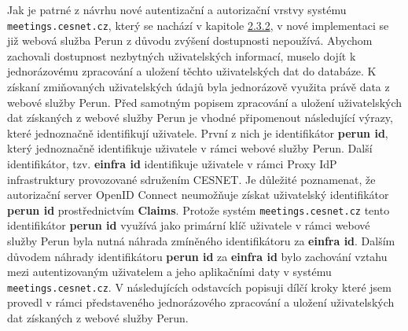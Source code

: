 \documentclass[
  printed, %
  twoside, %
  table,   %
  nolof,     %
  nolot,     %
]{fithesis3}
\begin{document}
\par 

Jak je patrné z návrhu nové autentizační a autorizační vrstvy systému \texttt{meetings.cesnet.cz}, který se nachází v kapitole \hyperref[shong-proposal]{2.3.2}, v nové implementaci se již webová služba Perun z důvodu zvýšení dostupnosti nepoužívá. Abychom zachovali dostupnost nezbytných uživatelských informací, muselo dojít k jednorázovému zpracování a uložení těchto uživatelských dat do databáze. K získaní zmiňovaných uživatelských údajů byla jednorázově využita právě data z webové služby Perun. Před samotným popisem zpracování a uložení uživatelských dat získaných z webové služby Perun je vhodné připomenout následující výrazy, které jednoznačně identifikují uživatele. První z nich je identifikátor \textbf{perun id}, který jednoznačně identifikuje uživatele v rámci webové služby Perun. Další identifikátor, tzv. \textbf{einfra id} identifikuje uživatele v rámci Proxy IdP infrastruktury provozované sdružením CESNET. Je důležité poznamenat, že autorizační server OpenID Connect neumožňuje získat uživatelský identifikátor \textbf{perun id} prostřednictvím \textbf{Claims}. Protože systém \texttt{meetings.cesnet.cz} tento identifikátor \textbf{perun id} využívá jako primární klíč uživatele v rámci webové služby Perun byla nutná náhrada zmíněného identifikátoru za \textbf{einfra id}. Dalším důvodem náhrady identifikátoru \textbf{perun id} za \textbf{einfra id} bylo zachování vztahu mezi autentizovaným uživatelem a jeho aplikačními daty v systému \texttt{meetings.cesnet.cz}. V následujících odstavcích popisuji dílčí kroky které jsem provedl v rámci představeného jednorázového zpracování a uložení uživatelských dat získaných z webové služby Perun. 

\par
\end{document}
